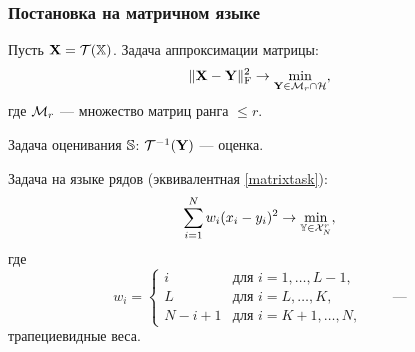 \documentclass[unicode, notheorems]{beamer}
\begin{document}
\begin{frame}
	\frametitle{Постановка на матричном языке}
	\vspace{-0.2cm}
	Пусть $\mathbf{X} = \mathcal{T}(\mathbb{X})$. Задача аппроксимации матрицы:
	\begin{equation} \label{matrixtask}
	\|\mathbf{X} - \mathbf{Y}\|^2_{\mathrm{F}} \to \min_{\substack{\mathbf{Y} \in \mathcal{M}_r \cap \mathcal{H}}},
	\end{equation}
	где $\mathcal{M}_r$ --- множество матриц ранга $\le r$.
	
	Задача оценивания $\mathbb{S}$: $\mathcal{T}^{-1}(\mathbf{Y})$ --- оценка.
	
	Задача на языке рядов (эквивалентная \eqref{matrixtask}):
	\begin{equation*}
	\sum \limits_{i=1}^N w_i(x_i - y_i)^2 \to \min_{\mathbb{Y} \in \mathcal{X}_N^r},
	\end{equation*}
	где	\begin{equation*}
	w_i = \begin{cases}
	i & \text{для $i = 1, \ldots, L-1,$}\\
	L & \text{для $i = L, \ldots, K,$}\\
	N - i + 1 & \text{для $i = K + 1, \ldots, N,$}
	\end{cases} \qquad \text{---}
	\end{equation*}
	трапециевидные веса.
\end{frame}

\end{document}
